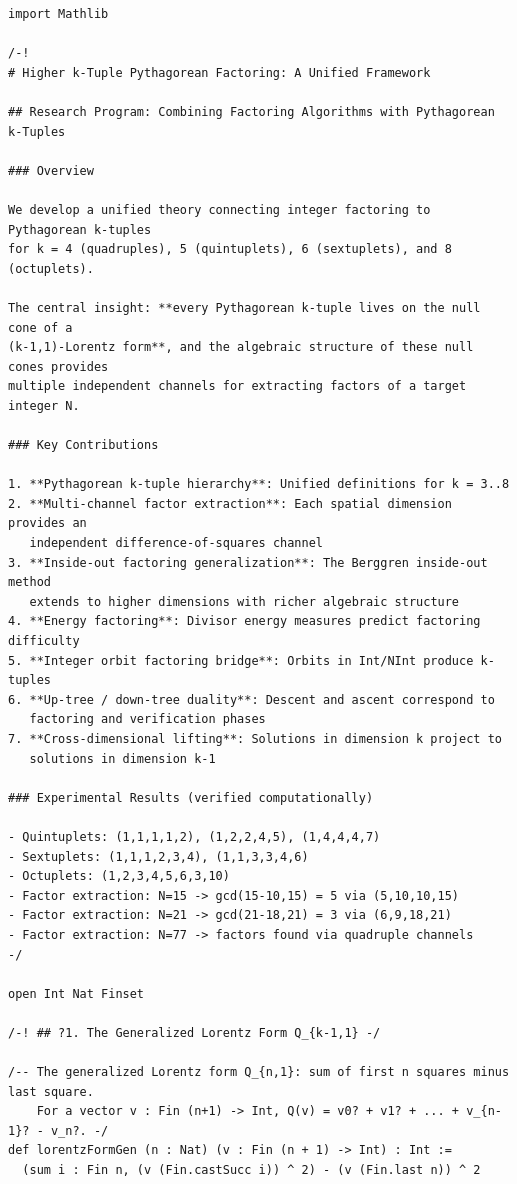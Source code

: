 \documentclass[11pt,twoside,openright]{book}
\theoremstyle{definition}
\theoremstyle{remark}
\begin{document}
\begin{lstlisting}[style=lean]
import Mathlib

/-!
# Higher k-Tuple Pythagorean Factoring: A Unified Framework

## Research Program: Combining Factoring Algorithms with Pythagorean k-Tuples

### Overview

We develop a unified theory connecting integer factoring to Pythagorean k-tuples
for k = 4 (quadruples), 5 (quintuplets), 6 (sextuplets), and 8 (octuplets).

The central insight: **every Pythagorean k-tuple lives on the null cone of a
(k-1,1)-Lorentz form**, and the algebraic structure of these null cones provides
multiple independent channels for extracting factors of a target integer N.

### Key Contributions

1. **Pythagorean k-tuple hierarchy**: Unified definitions for k = 3..8
2. **Multi-channel factor extraction**: Each spatial dimension provides an
   independent difference-of-squares channel
3. **Inside-out factoring generalization**: The Berggren inside-out method
   extends to higher dimensions with richer algebraic structure
4. **Energy factoring**: Divisor energy measures predict factoring difficulty
5. **Integer orbit factoring bridge**: Orbits in Int/NInt produce k-tuples
6. **Up-tree / down-tree duality**: Descent and ascent correspond to
   factoring and verification phases
7. **Cross-dimensional lifting**: Solutions in dimension k project to
   solutions in dimension k-1

### Experimental Results (verified computationally)

- Quintuplets: (1,1,1,1,2), (1,2,2,4,5), (1,4,4,4,7)
- Sextuplets: (1,1,1,2,3,4), (1,1,3,3,4,6)
- Octuplets: (1,2,3,4,5,6,3,10)
- Factor extraction: N=15 -> gcd(15-10,15) = 5 via (5,10,10,15)
- Factor extraction: N=21 -> gcd(21-18,21) = 3 via (6,9,18,21)
- Factor extraction: N=77 -> factors found via quadruple channels
-/

open Int Nat Finset

/-! ## ?1. The Generalized Lorentz Form Q_{k-1,1} -/

/-- The generalized Lorentz form Q_{n,1}: sum of first n squares minus last square.
    For a vector v : Fin (n+1) -> Int, Q(v) = v0? + v1? + ... + v_{n-1}? - v_n?. -/
def lorentzFormGen (n : Nat) (v : Fin (n + 1) -> Int) : Int :=
  (sum i : Fin n, (v (Fin.castSucc i)) ^ 2) - (v (Fin.last n)) ^ 2


\end{lstlisting}
\end{document}

